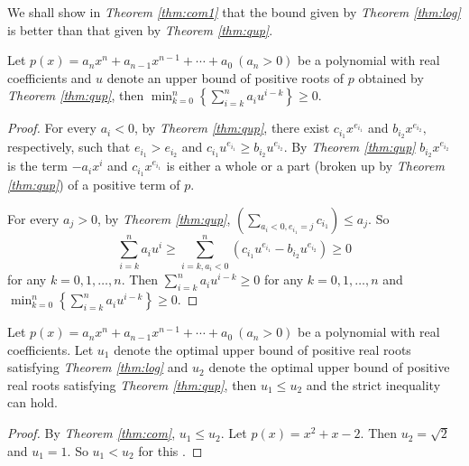 We shall show in {\em Theorem \ref{thm:com1}} that the bound given by {\em Theorem \ref{thm:log}} is better than that given by {\em Theorem \ref{thm:qup}}.









\begin{theorem}\label{thm:com}
	Let $p(x)=a_nx^n+a_{n-1}x^{n-1}+\cdots+a_0\ (a_n>0)$ be a polynomial with real coefficients and   $u$ denote an upper bound of positive roots of $p$ obtained by {\em Theorem \ref{thm:qup}}, then $\min_{k=0}^{n}\left\{  \sum_{i=k}^n a_i u^{i-k}\right\}\ge0$.
	
\end{theorem}

\begin{proof}

	For every $ a_i<0$, by {\em Theorem \ref{thm:qup}}, there exist  $c_{i_1}x^{e_{i_1}}$ and $b_{i_2}x^{e_{i_2}},$  respectively, such that
	$e_{i_1}>e_{i_2}$ and $c_{i_1}u^{e_{i_1}}\ge b_{i_2}u^{e_{i_2}}$. By  {\em Theorem \ref{thm:qup}} $b_{i_2}x^{e_{i_2} }$ is the term $-a_ix^i$
	and $c_{i_1}x^{e_{i_1} }$ is either a whole or a part (broken up by {\em Theorem \ref{thm:qup}}) of a positive term of $p$.
	
	For every  $a_j>0$, by {\em Theorem \ref{thm:qup}}, $\left( \sum_{a_i<0,e_{i_1}=j }c_{i_1} \right)\le a_{j}$. So \begin{dmath*}\sum_{i=k}^na_iu^i\ge \sum_{i=k,a_i<0}^n \left( c_{i_1}u^{e_{i_1}}-
		b_{i_2}u^{e_{i_2}} \right)\ge 0 \end{dmath*} for any $k= 0,1,\ldots,n$. Then $\sum_{i=k}^n a_i u^{i-k}\ge0 $ for any  $k= 0,1,\ldots,n$ and
	$\min_{k=0}^{n}\left\{  \sum_{i=k}^n a_i u^{i-k}\right\}\ge0$.
\end{proof}

\begin{theorem}\label{thm:com1}
	
	Let $p(x)=a_nx^n+a_{n-1}x^{n-1}+\cdots+a_0\ (a_n>0)$ be a polynomial with real coefficients. Let  $u_1$ denote the optimal upper bound of
	positive real roots satisfying {\em Theorem \ref{thm:log}} and $u_2$ denote the optimal upper bound of positive real roots satisfying {\em Theorem \ref{thm:qup}}, then $u_1\le u_2$ and the  strict inequality can hold.
\end{theorem}

\begin{proof}
	By {\em Theorem \ref{thm:com}}, $u_1\le u_2$.
	Let $p(x)=x^2+x-2$. Then $u_2=\sqrt{2}$ and $u_1=1$. So
	$u_1<u_2$ for this .
\end{proof}


